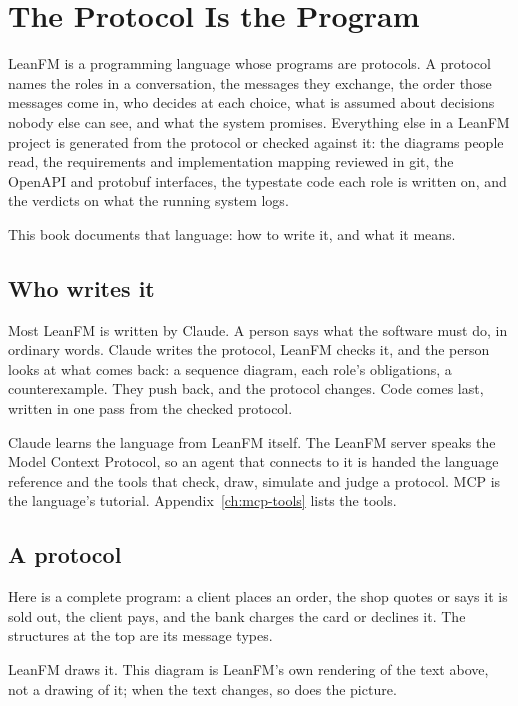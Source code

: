 \chapter{The Protocol Is the Program}
\label{ch:language}
\label{ch:vision}

LeanFM is a programming language whose programs are protocols. A protocol names
the roles in a conversation, the messages they exchange, the order those messages
come in, who decides at each choice, what is assumed about decisions nobody else
can see, and what the system promises. Everything else in a LeanFM project is
generated from the protocol or checked against it: the diagrams people read, the
requirements and implementation mapping reviewed in git, the OpenAPI and protobuf
interfaces, the typestate code each role is written on, and the verdicts on what
the running system logs.

This book documents that language: how to write it, and what it means.

\section{Who writes it}

Most LeanFM is written by Claude. A person says what the software must do, in
ordinary words. Claude writes the protocol, LeanFM checks it, and the person
looks at what comes back: a sequence diagram, each role's obligations, a
counterexample. They push back, and the protocol changes. Code comes last,
written in one pass from the checked protocol.

Claude learns the language from LeanFM itself. The LeanFM server speaks the Model
Context Protocol, so an agent that connects to it is handed the language
reference and the tools that check, draw, simulate and judge a protocol. MCP is
the language's tutorial. Appendix~\ref{ch:mcp-tools} lists the tools.

\section{A protocol}

Here is a complete program: a client places an order, the shop quotes or says it
is sold out, the client pays, and the bank charges the card or declines it. The
structures at the top are its message types.



LeanFM draws it. This diagram is LeanFM's own rendering of the text above, not a
drawing of it; when the text changes, so does the picture.


